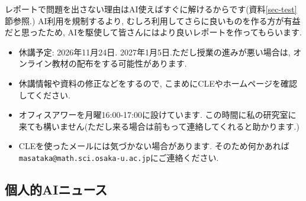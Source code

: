 \documentclass[dvipdfmx,a4paper,11pt]{article} %
\theoremstyle{definition}
\numberwithin{equation}{section}
\begin{document}
レポートで問題を出さない理由はAI使えばすぐに解けるからです(資料\ref{sec-test}節参照.)
AI利用を規制するより, むしろ利用してさらに良いものを作る方が有益だと思ったため, AIを駆使して皆さんにはより良いレポートを作ってもらいます. 



\vspace{11pt}
\begin{itemize}
  \setlength{\parskip}{0cm} %
  \setlength{\itemsep}{0cm} %
  \item 休講予定: 2026年11月24日. 2027年1月5日.ただし授業の進みが悪い場合は, オンライン教材の配布をする可能性があります. 
  \item 休講情報や資料の修正などをするので, こまめにCLEやホームページを確認してください.
   \item オフィスアワーを月曜16:00-17:00に設けています. この時間に私の研究室に来ても構いません(ただし来る場合は前もって連絡してくれると助かります.)
   \item CLEを使ったメールには気づかない場合があります. そのため何かあれば\nolinkurl{masataka@math.sci.osaka-u.ac.jp}にご連絡ください. 
 \end{itemize}

\newpage

\subsection*{個人的AIニュース}
\end{document}
